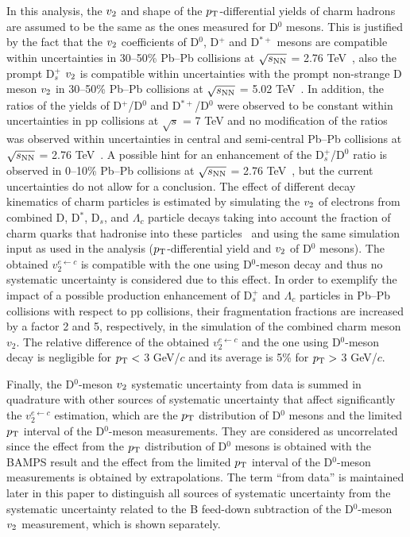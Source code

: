 \documentclass[11pt,a4paper]{article}
\providecommand{\pT}{$p_{\rm T}$ }
\providecommand{\vtwo}{$v_{\rm 2}$ }
\providecommand{\s}{$\sqrt{s}$ }
\providecommand{\snn}{$\sqrt{s_{\rm NN}}$ }
\begin{document}
In this analysis, the \vtwo and shape of the $p_{\rm T}$-differential yields of charm hadrons are assumed to be the same as the ones measured for D$^{0}$ mesons. 
This is justified by the fact that the  \vtwo coefficients of  D$^{0}$, D$^{+}$ and D$^{*+}$ mesons are compatible within uncertainties in 30--50\% Pb--Pb collisions at \snn = 2.76 TeV~\cite{Abelev:2013lca}, also the prompt D$_ {s}^{+}$ \vtwo is compatible within uncertainties with the prompt non-strange D meson \vtwo in 30--50\%  Pb--Pb collisions at \snn = 5.02 TeV~\cite{Acharya:2017qps}. In addition,   the ratios of the yields of D$^{+}$/D$^{0}$ and D$^{*+}$/D$^{0}$  were observed to be constant within uncertainties in pp collisions at \s = 7 TeV and no modification of the ratios was observed within uncertainties in central and semi-central Pb--Pb collisions at \snn = 2.76 TeV~\cite{Adam:2015sza}. 
A possible hint for an enhancement of the D$_ {s}^{+}$/D$^{0}$ ratio is observed in 0--10\% Pb--Pb collisions at \snn = 2.76 TeV~\cite{Adam2016}, but the current uncertainties do not allow for a conclusion. 
The effect of  different decay kinematics of  charm particles is estimated by simulating the \vtwo of electrons from combined D, D$^{*}$, D$_ {s}$, and $\Lambda_{c}$ particle decays taking into account the fraction of charm quarks that hadronise into these particles~\cite{AMSLER20081} and using the same simulation input as used in the analysis ($p_{\rm T}$-differential yield and \vtwo of D$^{0}$ mesons). The obtained $v_{2}^{e \leftarrow c}$ is compatible with the one using D$^{0}$-meson decay and thus no systematic uncertainty is considered due to this effect. 
In order to exemplify the impact of a possible production enhancement of  D$_ {s}^{+}$ and $\Lambda_{c}$ particles in Pb--Pb collisions with respect to pp collisions, their fragmentation fractions are increased by a factor 2 and 5, respectively, in the simulation of the combined charm meson $v_{2}$.  The relative difference of the obtained $v_{2}^{e \leftarrow c}$ and the one using D$^{0}$-meson decay is negligible for $p_{\rm T} <$ 3 GeV/$c$ and its average is 5\% for  $p_{\rm T} >$ 3 GeV/$c$.

Finally, the D$^{0}$-meson $v_{\rm 2}$ systematic uncertainty from data is summed in quadrature with other sources of systematic uncertainty that affect significantly the $v_{2}^{e \leftarrow c}$ estimation, which are the \pT distribution of D$^{0}$ mesons  and the limited \pT interval of the D$^{0}$-meson measurements. They are considered as uncorrelated since the effect from the \pT distribution of D$^{0}$ mesons is obtained with the BAMPS result and the effect from the limited \pT interval of the D$^{0}$-meson measurements is obtained by extrapolations. The term ``from data'' is maintained later in this paper to distinguish all sources of systematic uncertainty from the systematic uncertainty related to the  B feed-down subtraction of the D$^{0}$-meson $v_{\rm 2}$ measurement, which is shown separately.
\end{document}
